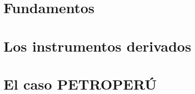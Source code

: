\frontmatter

\tableofcontents

\mainmatter
\part{Fundamentos}




\part{Los instrumentos derivados}





\part{El caso PETROPERÚ}




\appendix



